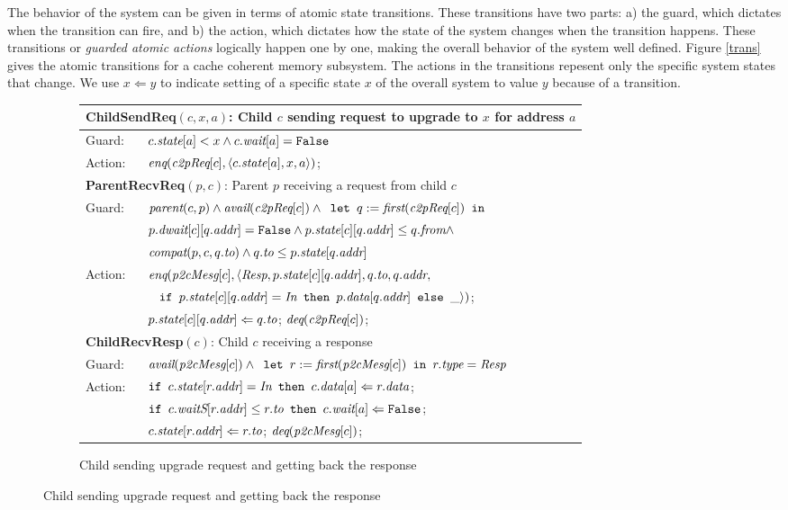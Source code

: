 The behavior of the system can be given in terms of atomic state transitions.
These transitions have two parts: a) the guard, which dictates when the
transition can fire, and b) the action, which dictates how the state of the
system changes when the transition happens. These transitions or \emph{guarded
atomic actions} logically happen one by one, making the overall behavior of the
system well defined. Figure \ref{trans} gives the atomic transitions for a
cache coherent memory subsystem. The actions in the transitions repesent only
the specific system states that change. We use $x \Leftarrow y$ to indicate
setting of a specific state $x$ of the overall system to value $y$ because of a
transition.
\begin{figure}
\small
\centering
\begin{subfigure}{\textwidth}
\centering
\begin{tabular}{|ll|}
\hline
\multicolumn{2}{|l|}{\textbf{ChildSendReq}$(c, x, a)$: Child $c$ sending request to upgrade to $x$ for address $a$}\\
\hline
Guard: & $c.\textit{state}[a] < x \wedge c.\textit{wait}[a] = \texttt{False}$\\
\hline
Action: & $\textit{enq}(\textit{c2pReq}[c], \langle c.\textit{state}[a], x, a \rangle)$;\\
\hline
\hline
\multicolumn{2}{|l|}{\textbf{ParentRecvReq}$(p, c)$: Parent $p$ receiving a request from child $c$}\\
\hline
Guard: & 
$\textit{parent}(c,p) \wedge \textit{avail}(\textit{c2pReq}[c]) \wedge \texttt{ let } q := \textit{first}(\textit{c2pReq}[c]) \texttt{ in }$\\
& $p.\textit{dwait}[c][q.\textit{addr}] = \texttt{False} \wedge p.\textit{state}[c][q.\textit{addr}] \le q.\textit{from} \wedge$\\
& $\textit{compat}(p, c, q.\textit{to}) \wedge q.\textit{to} \le p.\textit{state}[q.\textit{addr}]$\\
\hline
Action: & $\textit{enq}(\textit{p2cMesg}[c], \langle \textit{Resp}, p.\textit{state}[c][q.\textit{addr}], q.\textit{to}, q.\textit{addr}, $\\
& $\;\;\;%
\myif p.\dstate[c][q.\addr] = \In \mythen p.\data[q.\addr] \myelse \_\rangle)$;\\
& $p.\textit{state}[c][q.\textit{addr}] \Leftarrow q.\textit{to}$; $\textit{deq}(\textit{c2pReq}[c])$;\\
\hline
\hline
\multicolumn{2}{|l|}{\textbf{ChildRecvResp}$(c)$: Child $c$ receiving a response}\\
\hline
Guard: & 
$\textit{avail}(\textit{p2cMesg}[c]) \wedge \texttt{ let } r := \textit{first}(\textit{p2cMesg}[c]) \texttt{ in } r.\textit{type} = \textit{Resp}$\\
\hline
Action: & $\texttt{if } c.\textit{state}[r.\textit{addr}] = \textit{In} \texttt{ then } c.\textit{data}[a] \Leftarrow r.\textit{data}$;\\
&$\texttt{if } c.\textit{waitS}[r.\textit{addr}] \le r.\textit{to} \texttt{ then } c.\textit{wait}[a] \Leftarrow \texttt{False} $;\\
& $c.\textit{state}[r.\textit{addr}] \Leftarrow r.\textit{to}$; $\textit{deq}(\textit{p2cMesg}[c])$;\\
\hline
\end{tabular}
\caption{Child sending upgrade request and getting back the response}
\end{subfigure}


\end{figure}
